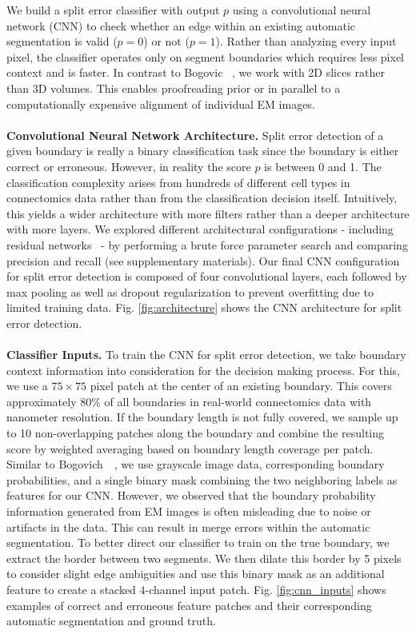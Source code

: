 We build a split error classifier with output $p$ using a convolutional neural network (CNN) to check whether an edge within an existing automatic segmentation is valid ($p=0$) or not ($p=1$). Rather than analyzing every input pixel, the classifier operates only on segment boundaries which requires less pixel context and is faster. In contrast to Bogovic \etal~\cite{BogovicHJ13}, we work with 2D slices rather than 3D volumes. This enables proofreading prior or in parallel to a computationally expensive alignment of individual EM images.
\\~\\
\textbf{Convolutional Neural Network Architecture.} Split error detection of a given boundary is really a binary classification task since the boundary is either correct or erroneous. However, in reality the score $p$ is between 0 and 1. The classification complexity arises from hundreds of different cell types in connectomics data rather than from the classification decision itself. Intuitively, this yields a wider architecture with more filters rather than a deeper architecture with more layers. We explored different architectural configurations - including residual networks~\cite{resnet} - by performing a brute force parameter search and comparing precision and recall (see supplementary materials). Our final CNN configuration for split error detection is composed of four convolutional layers, each followed by max pooling as well as dropout regularization to prevent overfitting due to limited training data. Fig. \ref{fig:architecture} shows the CNN architecture for split error detection.
\\~\\
\textbf{Classifier Inputs.} To train the CNN for split error detection, we take boundary context information into consideration for the decision making process. For this, we use a $75\times75$ pixel patch at the center of an existing boundary. This covers approximately $80\%$ of all boundaries in real-world connectomics data with nanometer resolution. If the boundary length is not fully covered, we sample up to 10 non-overlapping patches along the boundary and combine the resulting score by weighted averaging based on boundary length coverage per patch. 
Similar to Bogovich~\etal~\cite{BogovicHJ13}, we use grayscale image data, corresponding boundary probabilities, and a single binary mask combining the two neighboring labels as features for our CNN. However, we observed that the boundary probability information generated from EM images is often misleading due to noise or artifacts in the data. This can result in merge errors within the automatic segmentation. To better direct our classifier to train on the true boundary, we extract the border between two segments. We then dilate this border by 5 pixels to consider slight edge ambiguities and use this binary mask as an additional feature to create a stacked 4-channel input patch. Fig. \ref{fig:cnn_inputs} shows examples of correct and erroneous feature patches and their corresponding automatic segmentation and ground truth. 

